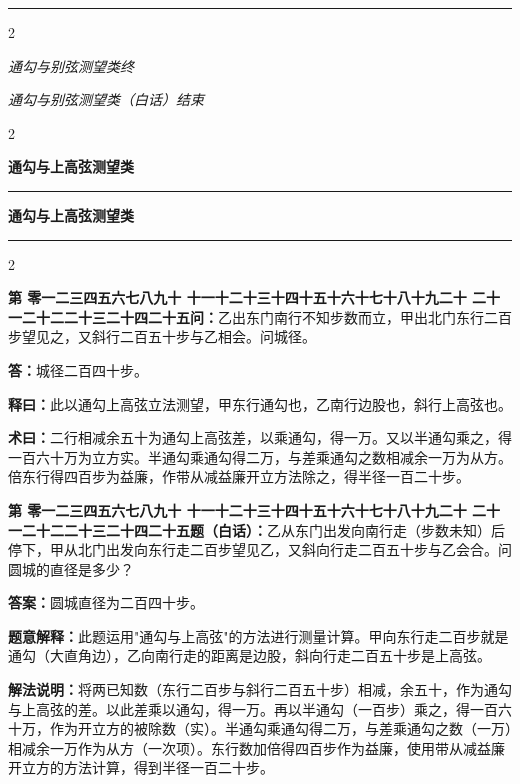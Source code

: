 \documentclass[10pt,a4paper]{article}
\newcommand{\longline}{\noindent\rule{\textwidth}{0.4pt}}
\newcounter{probnum}
\newcounter{probnumvol}[section]
\newcommand{\chnum}[1]{%
  \ifcase#1 零\or 一\or 二\or 三\or 四\or 五\or 六\or 七\or 八\or 九\or 十\or
    十一\or 十二\or 十三\or 十四\or 十五\or 十六\or 十七\or 十八\or 十九\or 二十\or
    二十一\or 二十二\or 二十三\or 二十四\or 二十五\fi}
\newcommand{\problemclassical}[1]{%
  \stepcounter{probnumvol}%
  \par\noindent
  \textcolor{classicalcolor}{\textbf{第\chnum{\value{probnumvol}}问：}}#1\par\smallskip
}
\newcommand{\problemmodern}[1]{%
  \par\noindent
  \textcolor{moderncolor}{\textbf{第\chnum{\value{probnumvol}}题（白话）：}}#1\par\smallskip
}
\newcommand{\answerclassical}[1]{%
  \par\noindent\textcolor{classicalcolor}{\textbf{答：}}#1\par
}
\newcommand{\answermodern}[1]{%
  \par\noindent\textcolor{moderncolor}{\textbf{答案：}}#1\par
}
\newcommand{\shiyiclassical}[1]{%
  \par\noindent\textcolor{classicalcolor}{\textbf{释曰：}}#1\par
}
\newcommand{\shiyimodern}[1]{%
  \par\noindent\textcolor{moderncolor}{\textbf{题意解释：}}#1\par
}
\newcommand{\shuyueclassical}[1]{%
  \par\noindent\textcolor{classicalcolor}{\textbf{术曰：}}#1\par
}
\newcommand{\shuyuemodern}[1]{%
  \par\noindent\textcolor{moderncolor}{\textbf{解法说明：}}#1\par
}
\newcommand{\volheaderclassical}[1]{%
  \begin{center}{\large\bfseries\color{volcolor} #1}\end{center}
  \vspace{0.3cm}
  \longline
  \vspace{0.3cm}
}
\newcommand{\volheadermodern}[1]{%
  \begin{center}{\large\bfseries\color{volcolor} #1}\end{center}
  \vspace{0.3cm}
  \longline
  \vspace{0.3cm}
}
\newcommand{\endclassical}[1]{%
  \vspace{0.3cm}
  \begin{center}\textit{#1}\end{center}
}
\newcommand{\endmodern}[1]{%
  \vspace{0.3cm}
  \begin{center}\textit{#1}\end{center}
}
\begin{document}
\vspace{0.5cm}
\longline
\begin{paracol}{2}
\endclassical{通勾与别弦测望类终}
\switchcolumn
\endmodern{通勾与别弦测望类（白话）结束}
\end{paracol}

\newpage


\setcounter{probnumvol}{0}

\begin{paracol}{2}

\volheaderclassical{通勾与上高弦测望类}

\switchcolumn

\volheadermodern{通勾与上高弦测望类}

\end{paracol}

\begin{paracol}{2}

\problemclassical{乙出东门南行不知步数而立，甲出北门东行二百步望见之，又斜行二百五十步与乙相会。问城径。}

\answerclassical{城径二百四十步。}

\shiyiclassical{此以通勾上高弦立法测望，甲东行通勾也，乙南行边股也，斜行上高弦也。}

\shuyueclassical{二行相减余五十为通勾上高弦差，以乘通勾，得一万。又以半通勾乘之，得一百六十万为立方实。半通勾乘通勾得二万，与差乘通勾之数相减余一万为从方。倍东行得四百步为益廉，作带从减益廉开立方法除之，得半径一百二十步。}

\switchcolumn

\problemmodern{乙从东门出发向南行走（步数未知）后停下，甲从北门出发向东行走二百步望见乙，又斜向行走二百五十步与乙会合。问圆城的直径是多少？}

\answermodern{圆城直径为二百四十步。}

\shiyimodern{此题运用"通勾与上高弦"的方法进行测量计算。甲向东行走二百步就是通勾（大直角边），乙向南行走的距离是边股，斜向行走二百五十步是上高弦。}

\shuyuemodern{将两已知数（东行二百步与斜行二百五十步）相减，余五十，作为通勾与上高弦的差。以此差乘以通勾，得一万。再以半通勾（一百步）乘之，得一百六十万，作为开立方的被除数（实）。半通勾乘通勾得二万，与差乘通勾之数（一万）相减余一万作为从方（一次项）。东行数加倍得四百步作为益廉，使用带从减益廉开立方的方法计算，得到半径一百二十步。}

\end{paracol}
\end{document}
